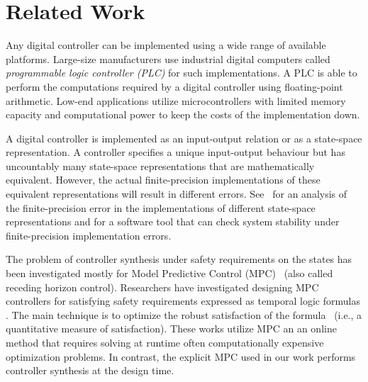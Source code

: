 \section{Related Work}

Any digital controller can be implemented using a wide range of available platforms. Large-size manufacturers use industrial digital computers called \emph{programmable logic controller (PLC)} for such implementations. A PLC is able to perform the computations required by a digital controller using floating-point arithmetic.  Low-end applications utilize microcontrollers with limited memory capacity and computational power to keep the costs of the implementation down.

A digital controller is implemented as an input-output relation or as a state-space representation.
A controller specifies a unique input-output behaviour but has uncountably many state-space representations that are mathematically equivalent.  However, the actual finite-precision implementations of these equivalent representations will result in different errors. See~\cite{ParkPSL17} for an analysis of the finite-precision error in the implementations of different state-space representations and \cite{Anta10} for a software tool that can check system stability under finite-precision implementation errors.

The problem of controller synthesis under safety requirements on the states has
been investigated mostly for Model Predictive Control (MPC)~\cite{camacho2013model} (also called receding horizon control).
Researchers have investigated designing MPC controllers for satisfying safety requirements expressed as temporal logic formulas 
\cite{FMPS18,KaramanSF08,raman2014model,WongpiromsarnTM12,pant2017smooth,kim2017dynamic}.
The main technique is to optimize the robust satisfaction of 
the formula~\cite{donze2010robust} (i.e., a quantitative measure of satisfaction).
These works utilize MPC an an online method that requires solving at runtime often computationally 
expensive optimization problems. In contrast, the explicit MPC used in our work performs controller synthesis at the design time.

